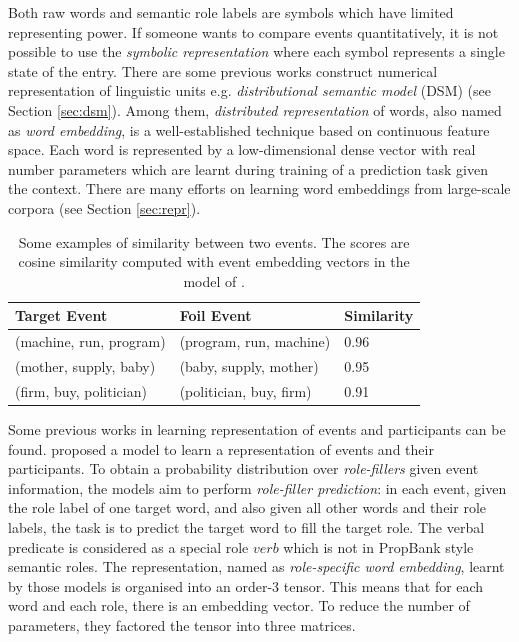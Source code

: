 \documentclass[a4paper]{article}
\begin{document}
Both raw words and semantic role labels are symbols which have limited representing power. If someone wants to compare events quantitatively, it is not possible to use the \textit{symbolic representation} where each symbol represents a single state of the entry. There are some previous works construct numerical representation of linguistic units e.g. \textit{distributional semantic model} (DSM) (see Section \ref{sec:dsm}). Among them, \textit{distributed representation} of words, also named as \textit{word embedding}, is a well-established technique based on continuous feature space. Each word is represented by a low-dimensional dense vector with real number parameters which are learnt during training of a prediction task given the context. There are many efforts on learning word embeddings from large-scale corpora (see Section \ref{sec:repr}). 

\begin{table}[t]
\centering
\begin{tabular}{lll}
\textbf{Target Event}    &   \textbf{Foil Event}    &   \textbf{Similarity} \\  \hline
(machine, run, program)      &   (program, run, machine)     &   0.96    \\
(mother, supply, baby)   &   (baby, supply, mother)  &   0.95    \\
(firm, buy, politician)    &   (politician, buy, firm)   &   0.91    \\
\end{tabular}
\caption{\label{tab:eventsim} Some examples of similarity between two events. The scores are cosine similarity computed with event embedding vectors in the model of \citet{tilk2016event}. }
\end{table}

Some previous works in learning representation of events and participants can be found. \citet{tilk2016event} proposed a model to learn a representation of events and their participants. To obtain a probability distribution over \textit{role-fillers} given event information, the models aim to perform \textit{role-filler prediction}: in each event, given the role label of one target word, and also given all other words and their role labels, the task is to predict the target word to fill the target role. The verbal predicate is considered as a special role $verb$ which is not in PropBank style semantic roles. The representation, named as \textit{role-specific word embedding}, learnt by those models is organised into an order-3 tensor. This means that for each word and each role, there is an embedding vector. To reduce the number of parameters, they factored the tensor into three matrices. 
\end{document}
